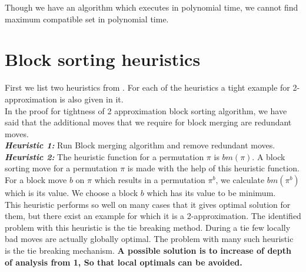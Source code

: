 \documentclass[BTech]{iitmdiss}
\begin{document}
\noindent Though we have an algorithm which executes in polynomial time, we cannot find maximum compatible set in polynomial time. 
\chapter{Block sorting heuristics}
First we list two heuristics from \citep{mahajan2008block}. For each of the heuristics a tight example for 2-approximation is also given in it.\\
In the proof for tightness of 2 approximation block sorting algorithm, we have said that the additional moves that we require for block merging are redundant moves.\\ 
\textit{\textbf{Heuristic 1:}} Run Block merging algorithm and remove redundant moves.\\
\textit{\textbf{Heuristic 2:}} The heuristic function for a permutation $\pi$ is $bm(\pi)$. A block sorting move for a permutation $\pi$ is made with the help of this heuristic function. For a block move $b$ on $\pi$ which results in a permutation $\pi^b$, we calculate $bm(\pi^b)$ which is its value. We choose a block $b$ which has its value to be minimum.\\
This heuristic performs so well on many cases that it gives optimal solution for them, but there exist an example for which it is a 2-approximation. The identified problem with this heuristic is the tie breaking method. During a tie few locally bad moves are actually globally optimal. The problem with many such heuristic is the tie breaking mechanism. \textbf{A possible solution is to increase of depth of analysis from 1, So that local optimals can be avoided.}\\
\end{document}
